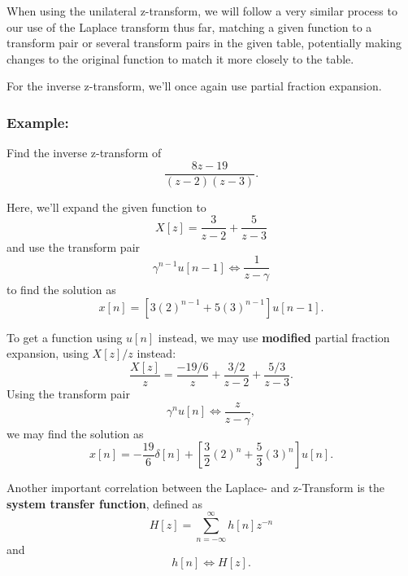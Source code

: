 \documentclass{article}
\begin{document}
When using the unilateral z-transform, we will follow a very similar process to our use of the Laplace transform thus far, matching a given function to a transform pair or several transform pairs in the given table, potentially making changes to the original function to match it more closely to the table.

For the inverse z-transform, we'll once again use partial fraction expansion.

\setcounter{subsubsection}{2}
\subsubsection{Example:}
Find the inverse z-transform of 
\[
  \frac{8z-19}{(z-2)(z-3)}.
\]

Here, we'll expand the given function to
\[
	X[z] = \frac{3}{z-2} + \frac{5}{z-3}
\]
and use the transform pair
\[
	\gamma^{n-1}u[n-1] \Leftrightarrow \frac{1}{z-\gamma}
\]
to find the solution as
\[
	x[n] = [3(2)^{n-1} + 5(3)^{n-1}]u[n-1].
\]

To get a function using \(u[n]\) instead, we may use \textbf{modified} partial fraction expansion, using \(X[z]/z\) instead:
\[
	\frac{X[z]}{z} = \frac{-19/6}{z} + \frac{3/2}{z-2} + \frac{5/3}{z-3}.
\]
Using the transform pair
\[
	\gamma^nu[n] \Leftrightarrow \frac{z}{z-\gamma},
\]
we may find the solution as 
\[
	x[n] = -\frac{19}{6}\delta[n] + [\frac{3}{2}(2)^n + \frac{5}{3}(3)^n]u[n].
\]

Another important correlation between the Laplace- and z-Transform is the \textbf{system transfer function}, defined as
\[
	H[z] = \sum_{n=-\infty}^{\infty}h[n]z^{-n}
\]
and
\[
	h[n] \Leftrightarrow H[z].
\]
\end{document}
